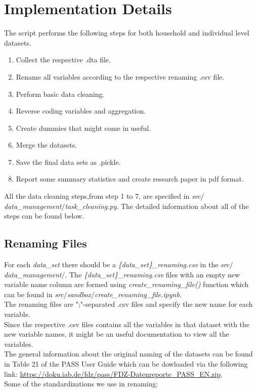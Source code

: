 \documentclass[11pt, a4paper, leqno]{article}
\begin{document}
\section{Implementation Details}\label{section:imp}
The script performs the following steps for both household and individual level datasets.
\begin{enumerate}
\item Collect the respective .dta file.
\item Rename all variables according to the respective renaming .csv file.
\item Perform basic data cleaning.
\item Reverse coding variables and aggregation.
\item Create dummies that might come in useful.
\item Merge the datasets.
\item Save the final data sets as .pickle.
\item Report some summary statistics and create research paper in pdf format.
\end{enumerate}
All the data cleaning steps,from step 1 to 7, are specified in  \emph {src$/$data\_management$/$task\_cleaning.py}.
The detailed information about all of the steps can be found below.

\subsection{Renaming Files}
For each \emph {data\_set} there should be a \emph {\{data\_set\}\_renaming.csv} in the  \emph {src$/$data\_management$/$}.
The \emph {\{data\_set\}\_renaming.csv} files with an empty new variable name column are formed using \emph {create\_renaming\_file()} function which can be found in  \emph {src$/$sandbox$/$create\_renaming\_file.ipynb}. \\[12pt]
The renaming files are ";"-separated .csv files and specify the new name for each variable.\\[12pt]
Since the respective .csv files contains all the variables in that dataset with the new variable names, it might be an useful documentation to view all the variables.\\[12pt]
The general information about the original naming of the datasets can be found in Table 21 of the PASS User Guide which can be dowloaded via the following link: \url{https://doku.iab.de/fdz/pass/FDZ-Datenreporte_PASS_EN.zip}.\\[12pt]
Some of the standardizations we use in renaming:
\end{document}
